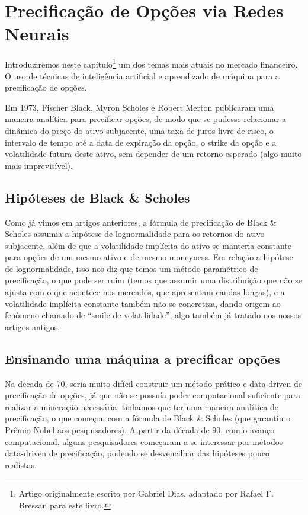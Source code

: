 \documentclass[]{book}
\let\rmarkdownfootnote\footnote%
\def\footnote{\protect\rmarkdownfootnote}
\theoremstyle{definition}
\theoremstyle{definition}
\theoremstyle{definition}
\theoremstyle{remark}
\begin{document}
\hypertarget{redes-neurais}{%
\chapter{Precificação de Opções via Redes Neurais}\label{redes-neurais}}

Introduziremos neste capítulo\footnote{Artigo originalmente escrito por Gabriel Dias, adaptado por Rafael F. Bressan para este livro.} um dos temas mais atuais no mercado financeiro. O uso de técnicas de inteligência artificial e aprendizado de máquina para a precificação de opções.

Em 1973, Fischer Black, Myron Scholes e Robert Merton publicaram uma maneira analítica para precificar opções, de modo que se pudesse relacionar a dinâmica do preço do ativo subjacente, uma taxa de juros livre de risco, o intervalo de tempo até a data de expiração da opção, o strike da opção e a volatilidade futura deste ativo, sem depender de um retorno esperado (algo muito mais imprevisível).

\hypertarget{hipoteses-de-black-scholes}{%
\section{Hipóteses de Black \& Scholes}\label{hipoteses-de-black-scholes}}

Como já vimos em artigos anteriores, a fórmula de precificação de Black \& Scholes \citep{Black1973} assumia a hipótese de lognormalidade para os retornos do ativo subjacente, além de que a volatilidade implícita do ativo se manteria constante para opções de um mesmo ativo e de mesmo moneyness. Em relação a hipótese de lognormalidade, isso nos diz que temos um método paramétrico de precificação, o que pode ser ruim (temos que assumir uma distribuição que não se ajusta com o que acontece nos mercados, que apresentam caudas longas), e a volatilidade implícita constante também não se concretiza, dando origem ao fenômeno chamado de ``smile de volatilidade'', algo também já tratado nos nossos artigos antigos.

\hypertarget{ensinando-uma-maquina-a-precificar-opcoes}{%
\section{Ensinando uma máquina a precificar opções}\label{ensinando-uma-maquina-a-precificar-opcoes}}

Na década de 70, seria muito difícil construir um método prático e data-driven de precificação de opções, já que não se possuía poder computacional suficiente para realizar a mineração necessária; tínhamos que ter uma maneira analítica de precificação, o que começou com a fórmula de Black \& Scholes (que garantiu o Prêmio Nobel aos pesquisadores). A partir da década de 90, com o avanço computacional, alguns pesquisadores começaram a se interessar por métodos data-driven de precificação, podendo se desvencilhar das hipóteses pouco realistas.
\end{document}
